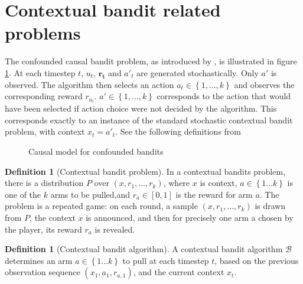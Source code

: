 \documentclass{article}
\newcommand{\set}[1]{\left\{#1\right\}}
\theoremstyle{plain}
\theoremstyle{definition}
\newtheorem{definition}[theorem]{Definition}
\begin{document}
\section{Contextual bandit related problems}

The confounded causal bandit problem, as introduced by \cite{Bareinboim2015}, is illustrated in figure \ref{fig:causalStructure}. At each timestep $t$, $u_t$, $\boldsymbol{r_t}$ and $a'_t$ are generated stochastically. Only $a'$ is observed. The algorithm then selects an action $a_t \in \set{1,...,k}$ and observes the corresponding reward $r_{a_t}$. $a' \in \set{1,...,k}$ corresponds to the action that would have been selected if action choice were not decided by the algorithm. This corresponds exactly to an instance of the standard stochastic contextual bandit problem, with context $x_t = a'_t$. See the following definitions from \cite{Langford2008}

\begin{figure}[h]
\centering
\caption{Causal model for confounded bandits}
\label{fig:causalStructure}
\end{figure}



\begin{definition}[Contextual bandit problem]
In a contextual bandits problem, there is a distribution
$P$ over $(x, r_1, ..., r_k)$, where $x$ is context, $a \in \set{1...k}$ is one of the $k$ arms to be pulled,and $r_a \in [0,1]$ is the reward for arm $a$. The problem is a repeated game: on each round, a sample
$(x, r_1, ..., r_k)$ is drawn from $P$, the context $x$ is announced, and then for precisely one arm a chosen
by the player, its reward $r_a$ is revealed.
\end{definition}

\begin{definition}[Contextual bandit algorithm] A contextual bandit algorithm $\mathcal{B}$ determines an arm $a \in \set{1...k}$ to pull at each timestep $t$, based on the previous observation sequence $(x_1, a_1,r_{a,1})$, and the current context $x_t$.
\end{definition}
\end{document}
